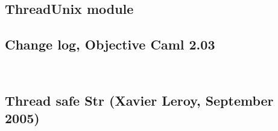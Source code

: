 \documentclass[a4paper,12pt]{article}
\begin{document}
\newpage
\subsection{ThreadUnix module}
\label{appendixThreadunix}
\begin{center}
  
\end{center}

\newpage
\subsection{Change log, Objective Caml 2.03}
\label{appendixChangelog}
{\tt
  \scriptsize
  
  \normalsize
}

\newpage
\subsection{Thread safe Str (Xavier Leroy, September 2005)}
\label{appendixThreadsafestr}
{\tt
  \scriptsize
  
  \normalsize
}
\end{document}
